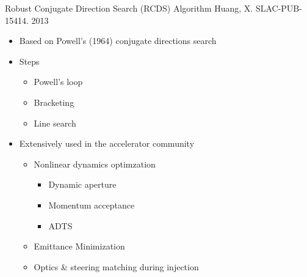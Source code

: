 \documentclass[aspectratio=169]{beamer}
\begin{document}
\begin{frame}{Robust Conjugate Direction Search (RCDS) Algorithm}
    Huang, X. SLAC-PUB-15414. 2013
    \begin{itemize}
    \item Based on Powell's (1964) conjugate directions search
    \item Steps
    \begin{itemize}
        \item Powell's loop
        \item Bracketing
        \item Line search
    \end{itemize}
    \item Extensively used in the accelerator community
    \begin{itemize}
        \item Nonlinear dynamics optimzation
        \begin{itemize}
            \item Dynamic aperture
            \item Momentum acceptance
            \item ADTS
        \end{itemize}
        \item Emittance Minimization
        \item Optics \& steering matching during injection
    \end{itemize}
   \end{itemize}
\end{frame}{}
\end{document}
